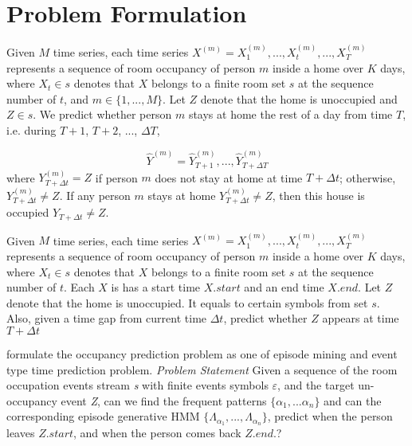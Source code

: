 \section{Problem Formulation}
Given $M$ time series, 
each time series $X^{(m)}=X^{(m)}_1, ..., X^{(m)}_t, ..., X_T^{(m)}$ 
represents a sequence of room occupancy of person $m$ inside 
a home over $K$ days, 
where $X_t\in s$ denotes that $X$ belongs to a finite room set $s$ at the sequence number of $t$, 
and $m\in\{1,...,M\}$. 
Let $Z$ denote that the home is unoccupied and $Z\in s$.  %
We predict whether person $m$ stays at home the rest of a day from time $T$,  i.e. during $T+1$, $T+2$, ..., $\Delta T$, 
 
\begin{equation}
\hat{Y}^{(m)}=\hat{Y}_{T+1}^{(m)},...,\hat{Y}^{(m)}_{T+\Delta T}
\end{equation}
where $Y_{T+\Delta t }^{(m)}=Z$ if person $m$ does not stay at home at time $T+\Delta t $;
otherwise, $Y_{T+\Delta t}^{(m)} \neq Z$. 
If any person $m$ stays at home $Y_{T+\Delta t}^{(m)} \neq Z$, then this house is occupied $Y_{T+ \Delta t} \neq Z$. 


\iffalse
Given $M$ time series, 
each time series $X^{(m)}=X^{(m)}_1, ..., X^{(m)}_t, ..., X_T^{(m)}$ 
represents a sequence of room occupancy of person $m$ inside 
a home over $K$ days, 
where $X_t\in s$ denotes that $X$ belongs to a finite room set $s$ at the sequence number of $t$. 
Each $X$ is has a start time $X.start$ and an end time $X.end$.  
Let $Z$ denote that the home is unoccupied. 
It equals to certain symbols from set $s$. 
Also, given a time gap from current time $\Delta t$, 
predict whether $Z$ appears at time  $T+\Delta t$

 formulate the occupancy prediction problem as one of 
episode mining and event type time prediction problem. 
\textit{Problem Statement} Given a sequence of the room occupation 
events stream \textit{s} with finite events symbols $\varepsilon$, 
and the target un-occupancy event \textit{Z}, can we
find the frequent patterns $\{\alpha_1,...\alpha_n\}$ 
and can the corresponding episode generative HMM 
$\{\Lambda_{\alpha_1}, ..., \Lambda_{\alpha_n}\}$, 
predict when 
the person leaves $Z.{start}$, 
and when the person comes back $Z.{end}$.?

